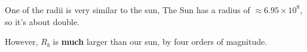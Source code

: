 \documentclass{article}
\begin{document}
\subsubsection{}
\begin{center}
    One of the radii is very similar to the sun,  The Sun has a radius of \(\approx 6.95 \times 10 ^8\), so it's about double. 

    However, \(R_b\) is \textbf{much} larger than our sun, by four orders of magnitude.

\end{center}

\subsection{}
\subsubsection{}
\end{document}
